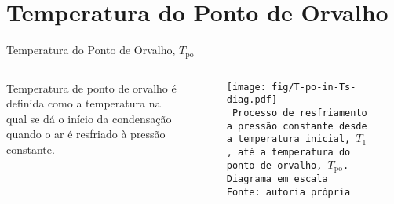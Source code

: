 \section{Temperatura do Ponto de Orvalho}

    \begin{frame}{Temperatura do Ponto de Orvalho, $T_{\mathrm{po}}$}\vspace*{-2em}
        \begin{columns}
            \begin{definition}
                \alert{Temperatura de ponto de orvalho} é definida como a temperatura na qual se
                dá o \alert{início da condensação} quando o ar é resfriado à \alert{pressão
                constante}.
            \end{definition}
            \begin{center}
                \begin{figure}
                    \fontsize{5.0}{5}\selectfont
                    \texttt{[image: fig/T-po-in-Ts-diag.pdf]}
                    \\\vspace*{-0.0em}\texttt{%
                        Processo de resfriamento a pressão constante desde a temperatura
                        inicial, $T_1$, até a temperatura do ponto de orvalho,
                        $T_{\mathrm{po}}$. Diagrama em escala \\
                        Fonte: autoria própria
                    }
                \end{figure}
            \end{center}
        \end{columns}
    \end{frame}

